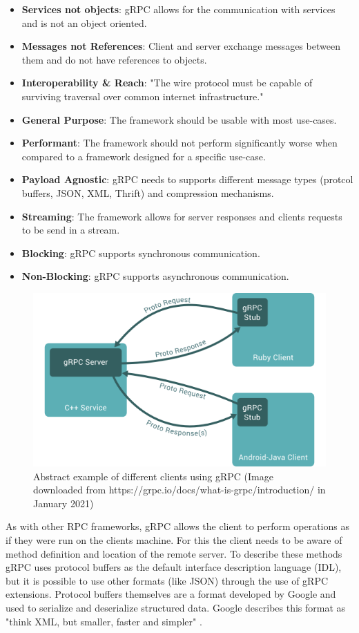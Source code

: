\documentclass[conference]{IEEEtran}
\begin{document}
\begin{itemize}
	\item \textbf{Services not objects}: gRPC allows for the communication with services and is not an object oriented.
	\item \textbf{Messages not References}: Client and server exchange messages between them and do not have references to objects.
	\item \textbf{Interoperability \& Reach}: "The wire protocol must be capable of surviving traversal over common internet infrastructure." \cite{grpcmotiviation}
	\item \textbf{General Purpose}: The framework should be usable with most use-cases.
	\item \textbf{Performant}: The framework should not perform significantly worse when compared to a framework designed for a specific use-case.
	\item \textbf{Payload Agnostic}: gRPC needs to supports different message types (protcol buffers, JSON, XML, Thrift) and compression mechanisms.
	\item \textbf{Streaming}: The framework allows for server responses and clients requests to be send in a stream.
	\item \textbf{Blocking}: gRPC supports synchronous communication.
	\item \textbf{Non-Blocking}: gRPC supports asynchronous communication.
\end{itemize}

\begin{figure}
	\centering
	\includegraphics[width=0.8\linewidth]{grpc1.png}
	\caption{Abstract example of different clients using gRPC (Image downloaded from https://grpc.io/docs/what-is-grpc/introduction/ in January 2021)}
	\label{fig:grpcuse}
\end{figure}

As with other RPC frameworks, gRPC allows the client to perform operations as if they were run on the clients machine. For this the client needs to be aware of method definition and location of the remote server. To describe these methods gRPC uses protocol buffers \cite{protoBuffer} as the default interface description language (IDL), but it is possible to use other formats (like JSON) through the use of gRPC extensions. Protocol buffers themselves are a format developed by Google and used to serialize and deserialize structured data. Google describes this format as "think XML, but smaller, faster and simpler" \cite{protoBuffer}. 
\end{document}

